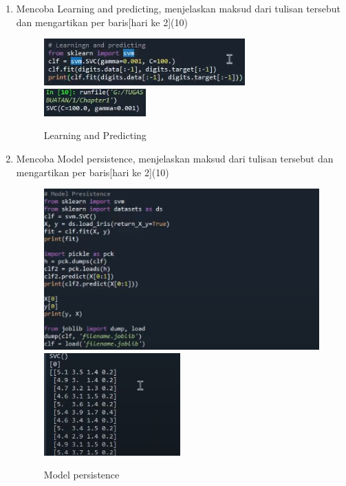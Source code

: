 \begin{enumerate}
    \item
          Mencoba Learning and predicting, menjelaskan maksud dari tulisan tersebut dan mengartikan per baris[hari ke 2](10)

          \begin{figure}[ht]
              \centerline{\includegraphics[scale=1]{figures/Chapter1d.png}
                  \includegraphics[scale=1]{figures/Chapter1da.png}}
              \caption{Learning and Predicting}
              \label{Learning and Predicting}
          \end{figure}


    \item
          Mencoba Model persistence, menjelaskan maksud dari tulisan tersebut dan mengartikan per baris[hari ke 2](10)

          \begin{figure}[ht]
              \centerline{\includegraphics[scale=0.8]{figures/Chapter1e.png}
                  \includegraphics[scale=0.8]{figures/Chapter1ea.png}}
              \caption{Model persistence}
              \label{Model persistence}
          \end{figure}


\end{enumerate}
